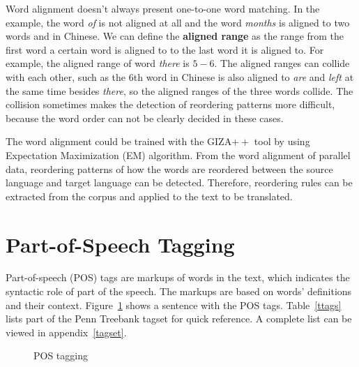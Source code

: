 \label{alignedrange}
Word alignment doesn't always present one-to-one word matching. In the example, the word \emph{of} is not aligned at all and the word \emph{months} is aligned to two words  and  in Chinese. We can define the \textbf{aligned range} as the range from the first word a certain word is aligned to to the last word it is aligned to. For example, the aligned range of word \emph{there} is $5-6$. The aligned ranges can collide with each other, such as the $6$th word  in Chinese is also aligned to \emph{are} and \emph{left} at the same time besides \emph{there}, so the aligned ranges of the three words collide. The collision sometimes makes the detection of reordering patterns more difficult, because the word order can not be clearly decided in these cases.

The word alignment could be trained with the GIZA$++$ tool by using Expectation Maximization (EM) algorithm. From the word alignment of parallel data, reordering patterns of how the words are reordered between the source language and target language can be detected. Therefore, reordering rules can be extracted from the corpus and applied to the text to be translated.

\section{Part-of-Speech Tagging}

Part-of-speech (POS) tags are markups of words in the text, which indicates the syntactic role of part of the speech. The markups are based on words' definitions and their context. Figure~\ref{tags} shows a sentence with the POS tags. Table~\ref{ttags} lists part of the Penn Treebank tagset for quick reference. A complete list can be viewed in appendix~\ref{tagset}.

\begin{figure}[H]

\centering

\caption{POS tagging}
\label{tags}
\end{figure}

